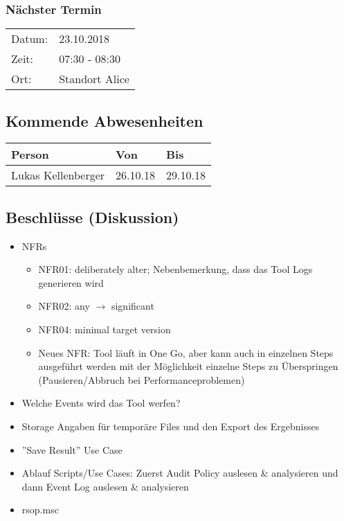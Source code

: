 \subsubsection*{Nächster Termin}

\begin{tabular}{p{4cm} p{12cm}}
    Datum: & 23.10.2018 \\
    Zeit: & 07:30 - 08:30 \\
    Ort: & Standort Alice \\
\end{tabular}

\subsection*{Kommende Abwesenheiten}
\begin{table}[H]
    \centering
    \begin{tabular}{p{6cm} p{5cm} p{5cm}}
        \textbf{Person} & \textbf{Von} & \textbf{Bis} \\ \hline
        Lukas Kellenberger & 26.10.18 & 29.10.18 \\ \hline
    \end{tabular}
\end{table}

\clearpage

\subsection*{Beschlüsse (Diskussion)}
\begin{itemize}
    \item NFRs
    \begin{itemize}
        \item NFR01: deliberately alter; Nebenbemerkung, dass das Tool Logs generieren wird
        \item NFR02: any $\rightarrow$ significant
        \item NFR04: minimal target version
        \item Neues NFR: Tool läuft in One Go, aber kann auch in einzelnen Steps ausgeführt werden mit der Möglichkeit einzelne Steps zu Überspringen (Pausieren/Abbruch bei Performanceproblemen)
    \end{itemize}
    \item Welche Events wird das Tool werfen?
    \item Storage Angaben für temporäre Files und den Export des Ergebnisses
    \item ''Save Result'' Use Case
    \item Ablauf Scripts/Use Cases: Zuerst Audit Policy auslesen \& analysieren und dann Event Log auslesen \& analysieren
    \item rsop.msc
\end{itemize}

